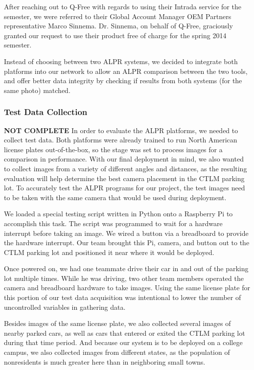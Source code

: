 \documentclass[11pt, oneside, fullpage, doublespace]{article}
\begin{document}
After reaching out to Q-Free with regards to using their Intrada service for the semester, we were referred to their Global Account Manager OEM Partners representative Marco Sinnema. Dr. Sinnema, on behalf of Q-Free, graciously granted our request to use their product free of charge for the spring 2014 semester.

Instead of choosing between two ALPR systems, we decided to integrate both platforms into our network to allow an ALPR comparison between the two tools, and offer better data integrity by checking if results from both systems (for the same photo) matched.

\subsubsection{Test Data Collection}
{\color{red}\textbf{NOT COMPLETE}}
In order to evaluate the ALPR platforms, we needed to collect test data. Both platforms were already trained to run North American license plates out-of-the-box, so the stage was set to process images for a comparison in performance. With our final deployment in mind, we also wanted to collect images from a variety of different angles and distances, as the resulting evaluation will help determine the best camera placement in the CTLM parking lot. To accurately test the ALPR programs for our project, the test images need to be taken with the same camera that would be used during deployment.

We loaded a special testing script written in Python onto a Raspberry Pi to accomplish this task. The script was programmed to wait for a hardware interrupt before taking an image. We wired a button via a breadboard to provide the hardware interrupt. Our team brought this Pi, camera, and button out to the CTLM parking lot and positioned it near where it would be deployed.

Once powered on, we had one teammate drive their car in and out of the parking lot multiple times. While he was driving, two other team members operated the camera and breadboard hardware to take images. Using the same license plate for this portion of our test data acquisition was intentional to lower the number of uncontrolled variables in gathering data.

Besides images of the same license plate, we also collected several images of nearby parked cars, as well as cars that entered or exited the CTLM parking lot during that time period. And because our system is to be deployed on a college campus, we also collected images from different states, as the population of nonresidents is much greater here than in neighboring small towns.
\end{document}
